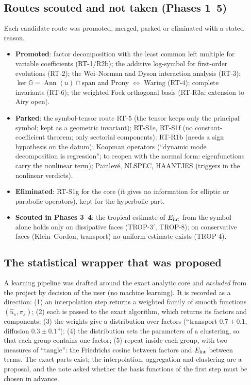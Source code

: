 \documentclass[11pt]{article}
\theoremstyle{plain}
\theoremstyle{definition}
\theoremstyle{remark}
\DeclareMathOperator{\Ann}{Ann}             %
\begin{document}
\subsection{Routes scouted and not taken (Phases 1--5)}

Each candidate route was promoted, merged, parked or eliminated with a stated reason.
\begin{itemize}
\item \textbf{Promoted}: factor decomposition with the least common left multiple for variable coefficients (RT-1/R2b); the additive log-symbol for first-order evolutions (RT-2); the Wei--Norman and Dyson interaction analysis (RT-3); $\ker\mathbb G=\Ann(u)\cap\mathrm{span}$ and Prony $\Leftrightarrow$ Waring (RT-4); complete invariants (RT-6); the weighted Fock orthogonal basis (RT-R3a; extension to Airy open).
\item \textbf{Parked}: the symbol-tensor route RT-5 (the tensor keeps only the principal symbol; kept as a geometric invariant); RT-S1e, RT-S1f (no constant-coefficient theorem; only sectorial components); RT-R1b (needs a sign hypothesis on the datum); Koopman operators (``dynamic mode decomposition is regression''; to reopen with the normal form: eigenfunctions carry the nonlinear term); Painlev\'e, NLSPEC, HAANTJES (triggers in the nonlinear verdicts).
\item \textbf{Eliminated}: RT-S1g for the core (it gives no information for elliptic or parabolic operators), kept for the hyperbolic part.
\item \textbf{Scouted in Phases 3--4}: the tropical estimate of $E_{\rm int}$ from the symbol alone holds only on dissipative faces (TROP-3$'$, TROP-8); on conservative faces (Klein--Gordon, transport) no uniform estimate exists (TROP-4).
\end{itemize}

\subsection{The statistical wrapper that was proposed}

A learning pipeline was drafted around the exact analytic core and \emph{excluded} from the project by decision of the user (no machine learning). It is recorded as a direction: (1) an interpolation step returns a weighted family of smooth functions $(\hat u_s,\pi_s)$; (2) each is passed to the exact algorithm, which returns its factors and components; (3) the weights give a distribution over factors (``transport $0.7\pm0.1$, diffusion $0.3\pm0.1$''); (4) the distribution sets the parameters of a clustering, so that each group contains one factor; (5) repeat inside each group, with two measures of ``tangle'': the Friedrichs cosine between factors and $E_{\rm int}$ between terms. The exact parts exist; the interpolation, aggregation and clustering are a proposal, and the note asked whether the basis functions of the first step must be chosen in advance.
\end{document}
